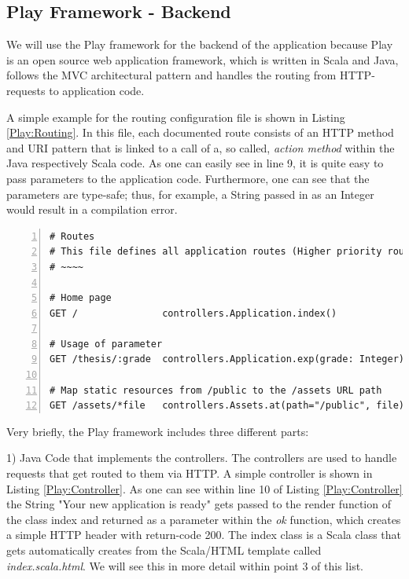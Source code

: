\subsection{Play Framework - Backend}	
We will use the Play framework for the backend of the application because Play is an open source web application framework, which is written in Scala and Java, follows the \ac{MVC} architectural pattern and handles the routing from \ac{HTTP}-requests to application code. 

A simple example for the routing configuration file is shown in Listing \ref{Play:Routing}. In this file, each documented route consists of an \ac{HTTP} method and \ac{URI} pattern that is linked to a call of a, so called, \textit{action method} within the Java respectively Scala code. As one can easily see in line 9, it is quite easy to pass parameters to the application code. Furthermore, one can see that the parameters are type-safe; thus, for example, a String passed in as an Integer would result in a compilation error. 

\begin{lstlisting}[numbers=left,caption={Simple routing configuration file within the Play Framework},label=Play:Routing,frame=tlbr,breaklines]
# Routes
# This file defines all application routes (Higher priority routes first)
# ~~~~

# Home page
GET /               controllers.Application.index()

# Usage of parameter
GET /thesis/:grade  controllers.Application.exp(grade: Integer)

# Map static resources from /public to the /assets URL path
GET /assets/*file   controllers.Assets.at(path="/public", file)
\end{lstlisting}

Very briefly, the Play framework includes three different parts: 

1) Java Code that implements the controllers. The controllers are used to handle requests that get routed to them via \ac{HTTP}. A simple controller is shown in Listing \ref{Play:Controller}. As one can see within line 10 of Listing \ref{Play:Controller} the String "Your new application is ready" gets passed to the render function of the class index and returned as a parameter within the \textit{ok} function, which creates a simple \ac{HTTP} header with return-code 200. The index class is a Scala class that gets automatically creates from the Scala/\ac{HTML} template called \textit{index.scala.html}. We will see this in more detail within point 3 of this list.

